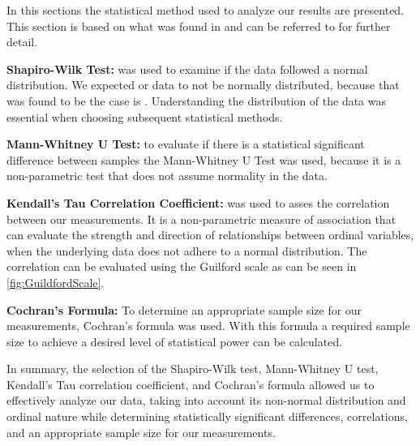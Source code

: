 

In this sections the statistical method used to analyze our results are presented. This section is based on what was found in \cite{biksbois} and can be referred to for further detail.\newline %



\noindent\textbf{Shapiro-Wilk Test:} was used to examine if the data followed a normal distribution. %
We expected or data to not be normally distributed, because that was found to be the case is \cite{biksbois}. Understanding the distribution of the data was essential when choosing subsequent statistical methods.\cite{razali2011power}\newline

\noindent\textbf{Mann-Whitney U Test:}
to evaluate if there is a statistical significant difference between samples the Mann-Whitney U Test was used, because it is a non-parametric test that does not assume normality in the data.\cite{mann1947test}\newline


\noindent\textbf{Kendall's Tau Correlation Coefficient:}
was used to asses the correlation between our measurements. It is a non-parametric measure of association that can evaluate the strength and direction of relationships between ordinal variables, when the underlying data does not adhere to a normal distribution.\cite{han1987non} The correlation can be evaluated using the Guilford scale
\cite[219]{guilford1950fundamental} as can be seen in \cref{fig:GuildfordScale}.\newline


\noindent\textbf{Cochran's Formula:}
To determine an appropriate sample size for our measurements, Cochran's formula was used. With this formula a required sample size to achieve a desired level of statistical power can be calculated.\cite{Cochran}\newline

\noindent In summary, the selection of the Shapiro-Wilk test, Mann-Whitney U test, Kendall's Tau correlation coefficient, and Cochran's formula allowed us to effectively analyze our data, taking into account its non-normal distribution and ordinal nature while determining statistically significant differences, correlations, and an appropriate sample size for our measurements.
